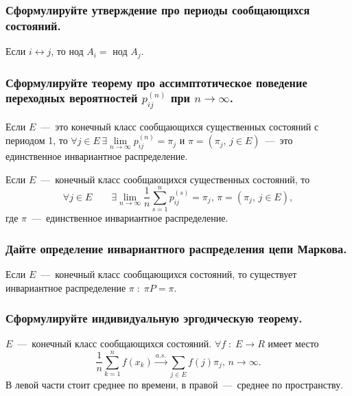 \subsubsection*{Сформулируйте утверждение про периоды сообщающихся состояний.}

Если $i \leftrightarrow j$, то нод $A_i = $ нод $A_j$.

\subsubsection*{Сформулируйте теорему про ассимптотическое поведение переходных
                вероятностей $p_{ij}^{ \left( n \right) }$ при $n \to \infty $.}

Если $E$~---~это конечный класс сообщающихся существенных состояний с периодом
1, то
$ \forall j \in E \,
  \exists \lim \limits_{n \to \infty } p_{ij}^{ \left( n \right) } = \pi_j$
и $ \pi = \left( \pi_j, \, j \in E \right) $~---~это единственное инвариантное
распределение.

Если $E$~---~конечный класс сообщающихся существенных состояний, то
\begin{equation*}
  \forall j \in E \qquad
  \exists \lim \limits_{n \to \infty }
    \frac{1}{n} \sum \limits_{s = 1}^n p_{ij}^{ \left( s \right) } = \pi_j, \,
  \pi = \left( \pi_j, \, j \in E \right),
\end{equation*}
где $ \pi $~---~единственное инвариантное распределение.

\subsubsection*{Дайте определение инвариантного распределения цепи Маркова.}

Если $E$~---~конечный класс сообщающихся состояний,
то существует инвариантное распределение $ \pi \; : \; \pi P = \pi $.

\subsubsection*{Сформулируйте индивидуальную эргодическую теорему.}

$E$~---~конечный класс сообщающихся состояний.
$ \forall f \; : \; E \to R$ имеет место
\begin{equation*}
  \frac{1}{n} \sum \limits_{k = 1}^n f \left( x_k \right) \overset{a.s.}{ \to }
  \sum \limits_{j \in E} f \left( j \right) \pi_j, \,
  n \to \infty.
\end{equation*}
В левой части стоит среднее по времени, в правой~---~среднее по пространству.

